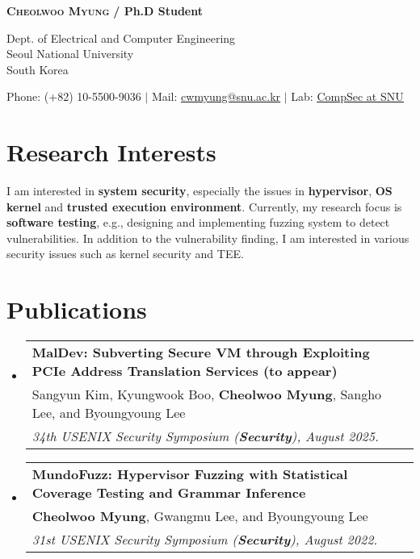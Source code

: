\documentclass[letterpaper,11pt]{article}
\makeatletter
\newcommand{\pubSubheading}[3]{
  \vspace{0pt}\item
    \begin{tabular*}{0.97\textwidth}[t]{l@{\extracolsep{\fill}}r}
      \vspace{5pt}
      \textbf{#1} \\ \vspace{5pt}
      #2 \\
      \textit{\small#3}
    \end{tabular*}\vspace{-7pt}
}
\newcommand{\resumeSubHeadingListStart}{\begin{itemize}[leftmargin=0.15in, label={}]}
\newcommand{\resumeSubHeadingListEnd}{\end{itemize}}
\makeatother
\begin{document}


\begin{center}
    \textbf{\Huge \scshape Cheolwoo Myung} \textbf{ /  Ph.D Student} \\ \vspace{10pt}
    
    Dept. of Electrical and Computer Engineering \\
    Seoul National University \\
    South Korea \\ \vspace{10pt}
    
    \small Phone: (+82) 10-5500-9036 $|$ Mail: \href{mailto:cwmyung@snu.ac.kr}{\underline{cwmyung@snu.ac.kr}} $|$ 
    Lab: \href{https://compsec.snu.ac.kr}{\underline{CompSec at SNU}}
\end{center}

\vspace{15pt}
\section{Research Interests}

I am interested in \textbf{system security}, especially the issues in \textbf{hypervisor}, \textbf{OS kernel} and \textbf{trusted execution environment}.
Currently, my research focus is \textbf{software testing}, e.g., designing and implementing fuzzing system to detect vulnerabilities. In addition to the vulnerability finding, I am interested in various security issues such as kernel security and TEE.

\vspace{10pt}

\section{Publications}
  \resumeSubHeadingListStart

    \pubSubheading
      {MalDev: Subverting Secure VM through Exploiting PCIe Address Translation Services (to appear)}
      {Sangyun Kim, Kyungwook Boo, \textbf{Cheolwoo Myung}, Sangho Lee, and Byoungyoung Lee}
      {34th USENIX Security Symposium (\textbf{Security}), August 2025.}
      \vspace{5pt}

    \pubSubheading
      {MundoFuzz: Hypervisor Fuzzing with Statistical Coverage Testing and Grammar Inference}
      {\textbf{Cheolwoo Myung}, Gwangmu Lee, and Byoungyoung Lee}
      {31st USENIX Security Symposium (\textbf{Security}), August 2022.}
  \resumeSubHeadingListEnd
\end{document}
